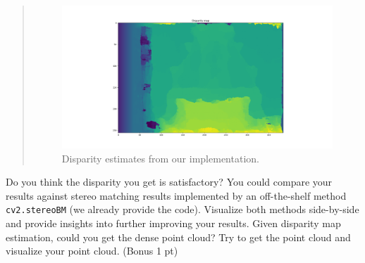 \documentclass[11pt]{article}
\begin{document}
\begin{quote}
\begin{figure}[h]
    \centering
    \includegraphics[width=1.0\linewidth]{disparity_ssd.png}
    \caption{Disparity estimates from our implementation.}
    \label{fig:disparity_ssd}
\end{figure}

\end{quote}

Do you think the disparity you get is satisfactory? You could compare your results against stereo matching results implemented by an off-the-shelf method \texttt{cv2.stereoBM} (we already provide the code). Visualize both methods side-by-side and provide insights into further improving your results. Given disparity map estimation, could you get the dense point cloud? Try to get the point cloud and visualize your point cloud.  (Bonus 1 pt)
\end{document}
